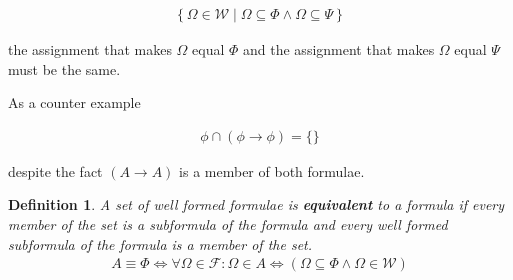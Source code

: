 \documentclass{article}
\newtheorem{defin}{Definition}
\begin{document}
\begin{align*}
\left\{\Omega \in \mathcal{W} \mid \Omega \subseteq \Phi \land \Omega \subseteq \Psi\right\}
\end{align*}

the assignment that makes $\Omega$ equal $\Phi$ and the assignment that makes $\Omega$ equal $\Psi$ must be the same.

As a counter example

\begin{align*}
\phi \cap (\phi \rightarrow \phi) = \{\}
\end{align*}

despite the fact $(A \rightarrow A)$ is a member of both formulae.

\begin{defin}
A set of well formed formulae is \textbf{equivalent} to a formula if every member of the set is a subformula of the formula and
every well formed subformula of the formula is a member of the set.
\begin{align*}
A \equiv \Phi \iff \forall \Omega \in \mathcal{F}: \Omega \in A \iff (\Omega \subseteq \Phi \land \Omega \in \mathcal{W})
\end{align*}
\end{defin}
\end{document}
